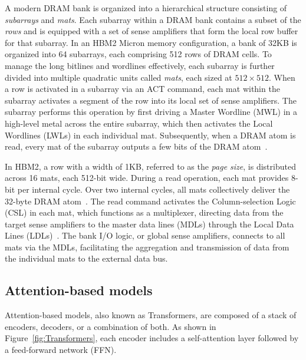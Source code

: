 
A modern DRAM bank is organized into a hierarchical structure consisting of \textit{subarrays} and \textit{mats}. Each subarray within a DRAM bank contains a subset of the \textit{rows} and is equipped with a set of sense amplifiers that form the local row buffer for that subarray. In an HBM2 Micron memory configuration, a bank of 32KB is organized into 64 subarrays, each comprising 512 rows of DRAM cells. To manage the long bitlines and wordlines effectively, each subarray is further divided into multiple quadratic units called \textit{mats}, each sized at $512\times512$. When a row is activated in a subarray via an ACT command, each mat within the subarray activates a segment of the row into its local set of sense amplifiers. The subarray performs this operation by first driving a Master Wordline (MWL) in a high-level metal across the entire subarray, which then activates the Local Wordlines (LWLs) in each individual mat. Subsequently, when a DRAM atom is read, every mat of the subarray outputs a few bits of the DRAM atom~\cite{fineDRAM}.

In HBM2, a row with a width of 1KB, referred to as the \textit{page size}, is distributed across 16 mats, each 512-bit wide. During a read operation, each mat provides 8-bit per internal cycle. Over two internal cycles, all mats collectively deliver the 32-byte DRAM atom~\cite{fineDRAM}. The read command activates the Column-selection Logic (CSL) in each mat, which functions as a multiplexer, directing data from the target sense amplifiers to the master data lines (MDLs) through the Local Data Lines (LDLs)~\cite{drambook, understandingDRAM}. The bank I/O logic, or global sense amplifiers, connects to all mats via the MDLs, facilitating the aggregation and transmission of data from the individual mats to the external data bus.

\subsection{Attention-based models}
Attention-based models, also known as Transformers, are composed of a stack of encoders, decoders, or a combination of both. As shown in Figure~\ref{fig:Transformers}, each encoder includes a self-attention layer followed by a feed-forward network (FFN).

